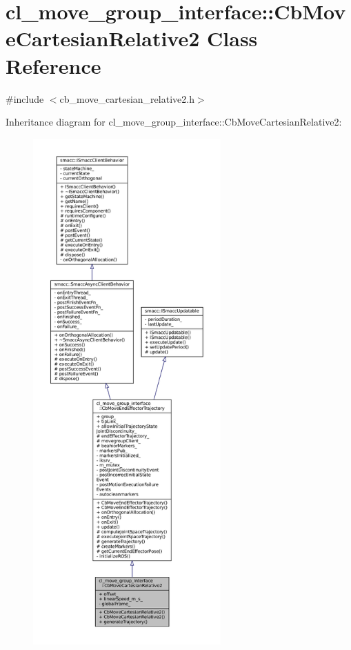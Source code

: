 \hypertarget{classcl__move__group__interface_1_1CbMoveCartesianRelative2}{}\section{cl\+\_\+move\+\_\+group\+\_\+interface\+:\+:Cb\+Move\+Cartesian\+Relative2 Class Reference}
\label{classcl__move__group__interface_1_1CbMoveCartesianRelative2}


{\ttfamily \#include $<$cb\+\_\+move\+\_\+cartesian\+\_\+relative2.\+h$>$}



Inheritance diagram for cl\+\_\+move\+\_\+group\+\_\+interface\+:\+:Cb\+Move\+Cartesian\+Relative2\+:
\nopagebreak
\begin{figure}[H]
\begin{center}
\leavevmode
\includegraphics[height=550pt]{classcl__move__group__interface_1_1CbMoveCartesianRelative2__inherit__graph}
\end{center}
\end{figure}


